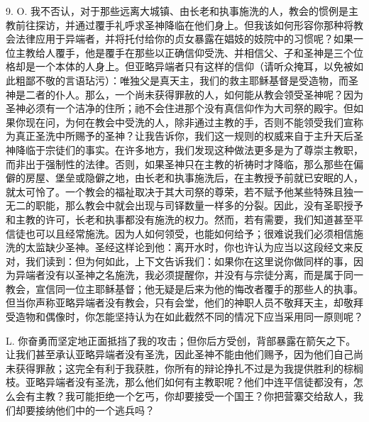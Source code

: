 9. O. 我不否认，对于那些远离大城镇、由长老和执事施洗的人，教会的惯例是主教前往探访，并通过覆手礼呼求圣神降临在他们身上。但我该如何形容你那种将教会法律应用于异端者，并将托付给你的贞女暴露在娼妓的妓院中的习惯呢？如果一位主教给人覆手，他是覆手在那些以正确信仰受洗、并相信父、子和圣神是三个位格却是一个本体的人身上。但亚略异端者只有这样的信仰（请听众掩耳，以免被如此粗鄙不敬的言语玷污）：唯独父是真天主，我们的救主耶稣基督是受造物，而圣神是二者的仆人。那么，一个尚未获得罪赦的人，如何能从教会领受圣神呢？因为圣神必须有一个洁净的住所；祂不会住进那个没有真信仰作为大司祭的殿宇。但如果你现在问，为何在教会中受洗的人，除非通过主教的手，否则不能领受我们宣称为真正圣洗中所赐予的圣神？让我告诉你，我们这一规则的权威来自于主升天后圣神降临于宗徒们的事实。在许多地方，我们发现这种做法更多是为了尊崇主教职，而非出于强制性的法律。否则，如果圣神只在主教的祈祷时才降临，那么那些在偏僻的房屋、堡垒或隐僻之地，由长老和执事施洗后，在主教授予前就已安眠的人，就太可怜了。一个教会的福祉取决于其大司祭的尊荣，若不赋予他某些特殊且独一无二的职能，那么教会中就会出现与司铎数量一样多的分裂。因此，没有圣职授予和主教的许可，长老和执事都没有施洗的权力。然而，若有需要，我们知道甚至平信徒也可以且经常施洗。因为人如何领受，也能如何给予；很难说我们必须相信施洗的太监缺少圣神。圣经这样论到他：离开水时，你也许认为应当以这段经文来反对，我们读到：但为何如此，上下文告诉我们：如果你在这里说你做同样的事，因为异端者没有以圣神之名施洗，我必须提醒你，并没有与宗徒分离，而是属于同一教会，宣信同一位主耶稣基督；他无疑是后来为他的悔改者覆手的那些人的执事。但当你声称亚略异端者没有教会，只有会堂，他们的神职人员不敬拜天主，却敬拜受造物和偶像时，你怎能坚持认为在如此截然不同的情况下应当采用同一原则呢？\par

L. 你奋勇而坚定地正面抵挡了我的攻击；但你后方受创，背部暴露在箭矢之下。让我们甚至承认亚略异端者没有圣洗，因此圣神不能由他们赐予，因为他们自己尚未获得罪赦；这完全有利于我获胜，你所有的辩论挣扎不过是为我提供胜利的棕榈枝。亚略异端者没有圣洗，那么他们如何有主教职呢？他们中连平信徒都没有，怎么会有主教？我可能拒绝一个乞丐，你却要接受一个国王？你把营寨交给敌人，我们却要接纳他们中的一个逃兵吗？\par

